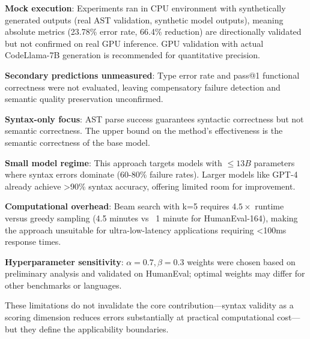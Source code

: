 \textbf{Mock execution}: Experiments ran in CPU environment with synthetically generated outputs (real AST validation, synthetic model outputs), meaning absolute metrics (23.78\% error rate, 66.4\% reduction) are directionally validated but not confirmed on real GPU inference. GPU validation with actual CodeLlama-7B generation is recommended for quantitative precision.

\textbf{Secondary predictions unmeasured}: Type error rate and pass@1 functional correctness were not evaluated, leaving compensatory failure detection and semantic quality preservation unconfirmed.

\textbf{Syntax-only focus}: AST parse success guarantees syntactic correctness but not semantic correctness. The upper bound on the method's effectiveness is the semantic correctness of the base model.

\textbf{Small model regime}: This approach targets models with $\leq 13B$ parameters where syntax errors dominate (60-80\% failure rates). Larger models like GPT-4 already achieve >90\% syntax accuracy, offering limited room for improvement.

\textbf{Computational overhead}: Beam search with k=5 requires 4.$5\times$ runtime versus greedy sampling (4.5 minutes vs ~1 minute for HumanEval-164), making the approach unsuitable for ultra-low-latency applications requiring <100ms response times.

\textbf{Hyperparameter sensitivity}: $\alpha =0.7, \beta =0.3$ weights were chosen based on preliminary analysis and validated on HumanEval; optimal weights may differ for other benchmarks or languages.

These limitations do not invalidate the core contribution---syntax validity as a scoring dimension reduces errors substantially at practical computational cost---but they define the applicability boundaries.


